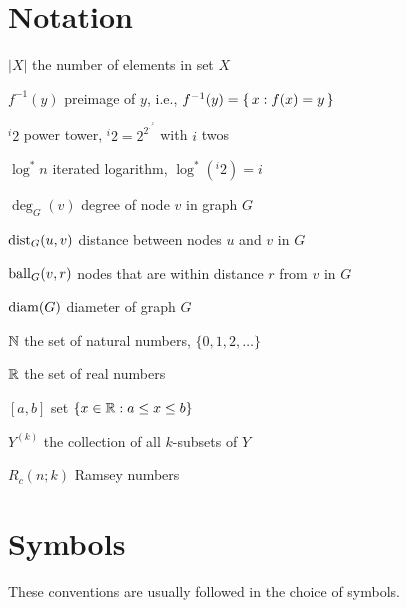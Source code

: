 
\section*{Notation}

{\raggedright
\begin{notation}
    \item[$|X|$] the number of elements in set $X$
    \item[$f^{-1}(y)$] preimage of $y$, i.e., $f^{-1}(y) = \{\,  x : f(x) = y  \,\}$
    \item[${}^i 2$] power tower, ${}^i 2 = 2^{2^{\cdot^{\cdot^2}}}$ with $i$ twos
    \item[$\log^* n$] iterated logarithm, $\log^*({}^i 2) = i$
    \item[$\deg_G(v)$] degree of node $v$ in graph $G$
    \item[$\operatorname{dist}_G(u,v)$] distance between nodes $u$ and $v$ in $G$
    \item[$\operatorname{ball}_G(v,r)$] nodes that are within distance $r$ from $v$ in $G$
    \item[$\operatorname{diam}(G)$] diameter of graph $G$
    \item[$\mathbb{N}$] the set of natural numbers, $\{0,1,2,\dotsc\}$
    \item[$\mathbb{R}$] the set of real numbers
    \item[{$[a,b]$}] set $\{x \in \mathbb{R} : a \le x \le b\}$
    \item[$Y^{(k)}$] the collection of all $k$-subsets of $Y$
    \item[$R_c(n;k)$] Ramsey numbers
\end{notation}}

\section*{Symbols}

These conventions are usually followed in the choice of symbols.

